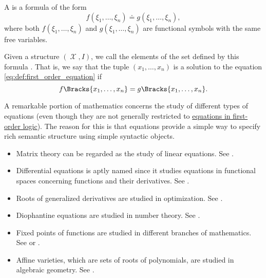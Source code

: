 \begin{definition}\label{def:first_order_equation}
  A  is a formula of the form
  \begin{equation}\label{eq:def:first_order_equation}
    f(\xi_1, \ldots, \xi_n) \doteq g(\xi_1, \ldots, \xi_n),
  \end{equation}
  where both \( f(\xi_1, \ldots, \xi_n) \) and \( g(\xi_1, \ldots, \xi_n) \) are functional symbols with the same free variables.

  Given a structure \( (\mscrX, I) \), we call the elements of the set defined by this formula . That is, we say that the tuple \( (x_1, \ldots, x_n) \) is a solution to the equation \eqref{eq:def:first_order_equation} if
  \begin{equation*}
    f\Bracks{x_1, \ldots, x_n} = g\Bracks{x_1, \ldots, x_n}.
  \end{equation*}
\end{definition}

\begin{example}\label{ex:equations}
  A remarkable portion of mathematics concerns the study of different types of equations (even though they are not generally restricted to \hyperref[def:first_order_equation]{equations in first-order logic}). The reason for this is that equations provide a simple way to specify rich semantic structure using simple syntactic objects.

  \begin{itemize}
    \item Matrix theory can be regarded as the study of linear equations. See .
    \item Differential equations is aptly named since it studies equations in functional spaces concerning functions and their derivatives. See .
    \item Roots of generalized derivatives are studied in optimization. See .
    \item Diophantine equations are studied in number theory. See .
    \item Fixed points of functions are studied in different branches of mathematics. See  or .
    \item Affine varieties, which are sets of roots of polynomials, are studied in algebraic geometry. See .
  \end{itemize}
\end{example}

